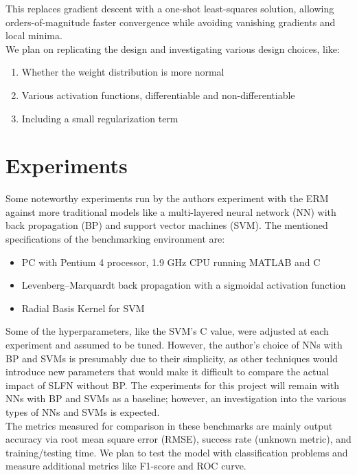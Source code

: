 \documentclass[12pt]{article}
\begin{document}
\noindent This replaces gradient descent with a one-shot least-squares solution, allowing orders-of-magnitude faster convergence while avoiding vanishing gradients and local minima. \\

\noindent We plan on replicating the design and investigating various design choices, like:
\begin{enumerate}
\item Whether the weight distribution is more normal
\item Various activation functions, differentiable and non-differentiable
\item Including a small regularization term
\end{enumerate}

\section{Experiments}
Some noteworthy experiments run by the authors experiment with the ERM against more traditional models like a multi-layered neural network (NN) with back propagation (BP) and support vector machines (SVM). The mentioned specifications of the benchmarking environment are:
\begin{itemize}
\item PC with Pentium 4 processor, 1.9 GHz CPU running MATLAB and C
\item Levenberg–Marquardt back propagation with a sigmoidal activation function
\item Radial Basis Kernel for SVM
\end{itemize}

Some of the hyperparameters, like the SVM's C value, were adjusted at each experiment and assumed to be tuned. However, the author's choice of NNs with BP and SVMs is presumably due to their simplicity, as other techniques would introduce new parameters that would make it difficult to compare the actual impact of SLFN without BP. The experiments for this project will remain with NNs with BP and SVMs as a baseline; however, an investigation into the various types of NNs and SVMs is expected. \\

The metrics measured for comparison in these benchmarks are mainly output accuracy via root mean square error (RMSE), success rate (unknown metric), and training/testing time. We plan to test the model with classification problems and measure additional metrics like F1-score and ROC curve. \\
\end{document}
